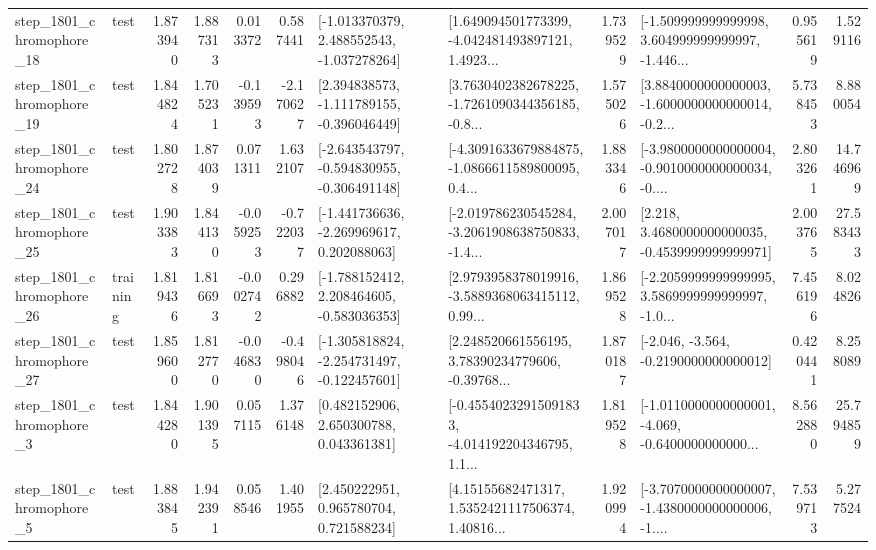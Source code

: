 \begin{tabular}{llrrrrllrlrr}
 step\_1801\_chromophore\_18 &      test &      1.873940 &    1.887313 &      0.013372 &  0.587441 &   [-1.013370379, 2.488552543, -1.037278264] &  [1.649094501773399, -4.042481493897121, 1.4923... &       1.739529 &  [-1.509999999999998, 3.604999999999997, -1.446... &            0.955619 &          1.529116 \\
 step\_1801\_chromophore\_19 &      test &      1.844824 &    1.705231 &     -0.139593 & -2.170627 &   [2.394838573, -1.111789155, -0.396046449] &  [3.7630402382678225, -1.7261090344356185, -0.8... &       1.575026 &  [3.8840000000000003, -1.6000000000000014, -0.2... &            5.738453 &          8.880054 \\
 step\_1801\_chromophore\_24 &      test &      1.802728 &    1.874039 &      0.071311 &  1.632107 &  [-2.643543797, -0.594830955, -0.306491148] &  [-4.3091633679884875, -1.0866611589800095, 0.4... &       1.883346 &  [-3.9800000000000004, -0.9010000000000034, -0.... &            2.803261 &         14.746969 \\
 step\_1801\_chromophore\_25 &      test &      1.903383 &    1.844130 &     -0.059253 & -0.722037 &   [-1.441736636, -2.269969617, 0.202088063] &  [-2.019786230545284, -3.2061908638750833, -1.4... &       2.007017 &   [2.218, 3.4680000000000035, -0.4539999999999971] &            2.003765 &         27.583433 \\
 step\_1801\_chromophore\_26 &  training &      1.819436 &    1.816693 &     -0.002742 &  0.296882 &   [-1.788152412, 2.208464605, -0.583036353] &  [2.9793958378019916, -3.5889368063415112, 0.99... &       1.869528 &  [-2.2059999999999995, 3.5869999999999997, -1.0... &            7.456196 &          8.024826 \\
 step\_1801\_chromophore\_27 &      test &      1.859600 &    1.812770 &     -0.046830 & -0.498046 &  [-1.305818824, -2.254731497, -0.122457601] &  [2.248520661556195, 3.78390234779606, -0.39768... &       1.870187 &              [-2.046, -3.564, -0.2190000000000012] &            0.420441 &          8.258089 \\
  step\_1801\_chromophore\_3 &      test &      1.844280 &    1.901395 &      0.057115 &  1.376148 &     [0.482152906, 2.650300788, 0.043361381] &  [-0.45540232915091833, -4.014192204346795, 1.1... &       1.819528 &  [-1.0110000000000001, -4.069, -0.6400000000000... &            8.562880 &         25.794859 \\
  step\_1801\_chromophore\_5 &      test &      1.883845 &    1.942391 &      0.058546 &  1.401955 &     [2.450222951, 0.965780704, 0.721588234] &  [4.15155682471317, 1.5352421117506374, 1.40816... &       1.920994 &  [-3.7070000000000007, -1.4380000000000006, -1.... &            7.539713 &          5.277524 \\

\end{tabular}
